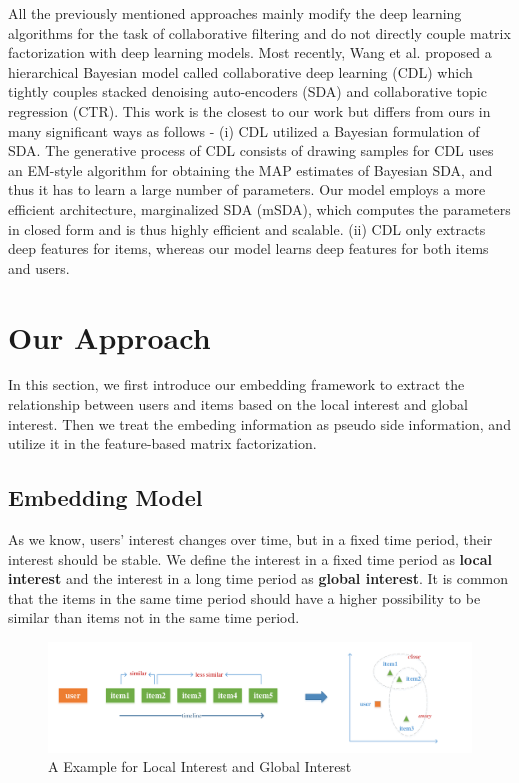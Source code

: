 \documentclass{sig-alternate-05-2015}
\begin{document}
All the previously mentioned approaches mainly modify the deep learning algorithms
for the task of collaborative filtering and
do not directly couple matrix factorization with deep learning models.
Most recently, Wang et al. \cite{wang2015collaborative} proposed a hierarchical Bayesian model
called collaborative deep learning (CDL) which tightly couples
stacked denoising auto-encoders (SDA) and collaborative topic regression (CTR).
This work is the closest to our work but differs from ours in many significant ways as follows -
(i) CDL utilized a Bayesian formulation of SDA.
The generative process of CDL consists of drawing samples for CDL uses an EM-style algorithm
for obtaining the MAP estimates of Bayesian SDA,
and thus it has to learn a large number of parameters.
Our model employs a more efficient architecture, marginalized SDA (mSDA),
which computes the parameters in closed form and is thus highly efficient and scalable.
(ii) CDL only extracts deep features for items,
whereas our model learns deep features for both items and users.

\section{Our Approach}
In this section,
we first introduce our embedding framework to extract the relationship
between users and items based on the local interest and global interest.
Then we treat the embeding information as pseudo side information,
and utilize it in the feature-based matrix factorization.

\subsection{Embedding Model}
As we know, users' interest changes over time,
but in a fixed time period, their interest should be stable.
We define the interest in a fixed time period as \textbf{local interest}
and the interest in a long time period as \textbf{global interest}.
It is common that the items in the same time period
should have a higher possibility to be similar than
items not in the same time period.

\begin{figure}[htbp]
	\centering
	\includegraphics[scale=0.6]{images/1.pdf}
	\caption{A Example for Local Interest and Global Interest}
	\label{fig:example}
\end{figure}
\end{document}
